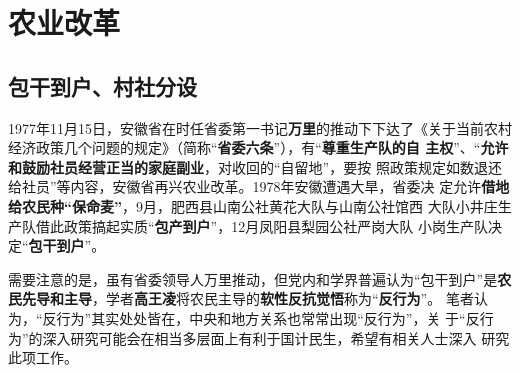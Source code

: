 



\section{农业改革}

\subsection{包干到户、村社分设}

1977年11月15日，安徽省在时任省委第一书记\textbf{万里}的推动下下达了《关于当前农村
经济政策几个问题的规定》（简称“\textbf{省委六条}”），有“\textbf{尊重生产队的自
  主权}”、“\textbf{允许和鼓励社员经营正当的家庭副业}，对收回的“自留地”，要按
照政策规定如数退还给社员”等内容，安徽省再兴农业改革。1978年安徽遭遇大旱，省委决
定允许\textbf{借地给农民种“保命麦”}，9月，肥西县山南公社黄花大队与山南公社馆西
大队小井庄生产队借此政策搞起实质“\textbf{包产到户}”，12月凤阳县梨园公社严岗大队
小岗生产队决定“\textbf{包干到户}”。

需要注意的是，虽有省委领导人万里推动，但党内和学界普遍认为“包干到户”是\textbf{农
  民先导和主导}，学者\textbf{高王凌}将农民主导的\textbf{软性反抗觉悟}称为“\textbf{反行为}”。
笔者认为，“反行为”其实处处皆在，中央和地方关系也常常出现“反行为”，关
于“反行为”的深入研究可能会在相当多层面上有利于国计民生，希望有相关人士深入
研究此项工作。

